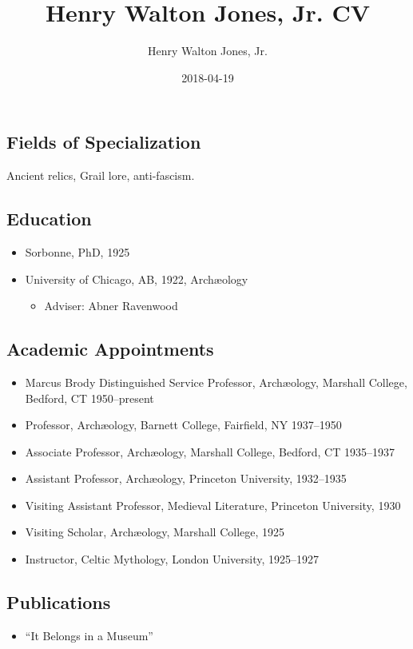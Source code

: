 \documentclass[]{article}
\title{Henry Walton Jones, Jr. CV}
\author{Henry Walton Jones, Jr.}
\date{2018-04-19}
\providecommand{\tightlist}{%
  \setlength{\itemsep}{0pt}\setlength{\parskip}{0pt}}
\begin{document}
\maketitle

\hypertarget{fields-of-specialization}{%
\subsection{Fields of Specialization}\label{fields-of-specialization}}

Ancient relics, Grail lore, anti-fascism.

\hypertarget{education}{%
\subsection{Education}\label{education}}

\begin{itemize}
\tightlist
\item
  Sorbonne, PhD, 1925
\item
  University of Chicago, AB, 1922, Archæology

  \begin{itemize}
  \tightlist
  \item
    Adviser: Abner Ravenwood
  \end{itemize}
\end{itemize}

\hypertarget{academic-appointments}{%
\subsection{Academic Appointments}\label{academic-appointments}}

\begin{itemize}
\tightlist
\item
  Marcus Brody Distinguished Service Professor, Archæology, Marshall
  College, Bedford, CT 1950--present
\item
  Professor, Archæology, Barnett College, Fairfield, NY 1937--1950
\item
  Associate Professor, Archæology, Marshall College, Bedford, CT
  1935--1937
\item
  Assistant Professor, Archæology, Princeton University, 1932--1935
\item
  Visiting Assistant Professor, Medieval Literature, Princeton
  University, 1930
\item
  Visiting Scholar, Archæology, Marshall College, 1925
\item
  Instructor, Celtic Mythology, London University, 1925--1927
\end{itemize}

\hypertarget{publications}{%
\subsection{Publications}\label{publications}}

\begin{itemize}
\tightlist
\item
  ``It Belongs in a Museum''
\end{itemize}
\end{document}

